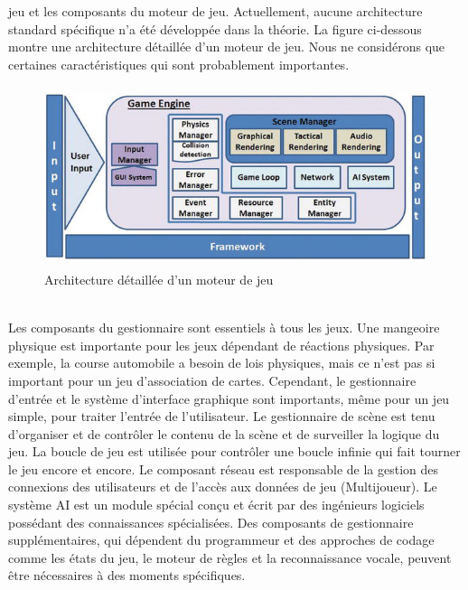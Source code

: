 \documentclass[ebook, 8pt, oneside, openany]{memoir}
\begin{document}
	jeu et les composants du moteur de jeu. Actuellement, aucune architecture standard spécifique n'a été
	développée dans la théorie. La figure ci-dessous montre une architecture détaillée d'un moteur de jeu.
	Nous ne considérons que certaines caractéristiques qui sont probablement importantes.
	\begin{figure}[h]
		\begin{center}\includegraphics[height = 150pt]{detailed_game_engine_architecture.png}\end{center}
		\caption{Architecture détaillée d'un moteur de jeu}
		\label{Architecture détaillée d'un moteur de jeu}
	\end{figure}
	\\Les composants du gestionnaire sont essentiels à tous les jeux. Une mangeoire physique est importante
	pour les jeux dépendant de réactions physiques. Par exemple, la course automobile a besoin de lois
	physiques, mais ce n'est pas si important pour un jeu d'association de cartes. Cependant, le
	gestionnaire d'entrée et le système d'interface graphique sont importants, même pour un jeu simple, pour
	traiter l'entrée de l'utilisateur. Le gestionnaire de scène est tenu d'organiser et de contrôler le
	contenu de la scène et de surveiller la logique du jeu. La boucle de jeu est utilisée pour contrôler une
	boucle infinie qui fait tourner le jeu encore et encore. Le composant réseau est responsable de la
	gestion des connexions des utilisateurs et de l'accès aux données de jeu (Multijoueur). Le système AI
	est un module spécial conçu et écrit par des ingénieurs logiciels possédant des connaissances
	spécialisées. Des composants de gestionnaire supplémentaires, qui dépendent du programmeur et des
	approches de codage comme les états du jeu, le moteur de règles et la reconnaissance vocale, peuvent
	être nécessaires à des moments spécifiques.

\end{document}
